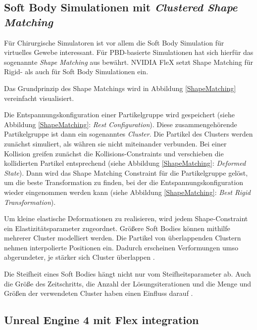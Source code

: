 \subsection{Soft Body Simulationen mit \textit{Clustered Shape Matching}}

Für Chirurgische Simulatoren ist vor allem die Soft Body Simulation für virtuelles Gewebe interessant. Für PBD-basierte Simulationen hat sich hierfür das sogenannte \textit{Shape Matching} aus \cite{Shape} bewährt. NVIDIA FleX setzt Shape Matching für Rigid- als auch für Soft Body Simulationen ein.

Das Grundprinzip des Shape Matchings wird in Abbildung \ref{ShapeMatching} vereinfacht visualisiert. 


Die Entspannungskonfiguration einer Partikelgruppe wird gespeichert (siehe Abbildung \ref{ShapeMatching}: \textit{Rest Configuration}). Diese zusammengehörende Partikelgruppe ist dann ein sogenanntes \textit{Cluster}. 
Die Partikel des Clusters werden zunächst simuliert, als währen sie nicht miteinander verbunden.
Bei einer Kollision greifen zunächst die Kollisions-Constraints und verschieben die kollidierten Partikel entsprechend (siehe Abbildung \ref{ShapeMatching}: \textit{Deformed State}). Dann wird das Shape Matching Constraint für die Partikelgruppe gelöst, um die beste Transformation zu finden, bei der die Entspannungskonfiguration wieder eingenommen werden kann (siehe Abbildung \ref{ShapeMatching}: \textit{Best Rigid Transformation}).

Um kleine elastische Deformationen zu realisieren, wird jedem Shape-Constraint ein 
Elastizitätsparameter
zugeordnet. Größere Soft Bodies können mithilfe mehrerer Cluster modelliert werden. Die Partikel von überlappenden Clustern nehmen interpolierte Positionen ein. Dadurch erscheinen Verformungen umso abgerundeter, je stärker sich Cluster überlappen \cite{FlexDoc}.

Die Steifheit eines Soft Bodies hängt nicht nur vom Steifheitsparameter ab. Auch die Größe des Zeitschritts, die Anzahl der Lösungsiterationen und die Menge und Größen der verwendeten Cluster haben einen Einfluss darauf \cite{PBDKidney}.

\subsection{Unreal Engine 4 mit Flex integration}


